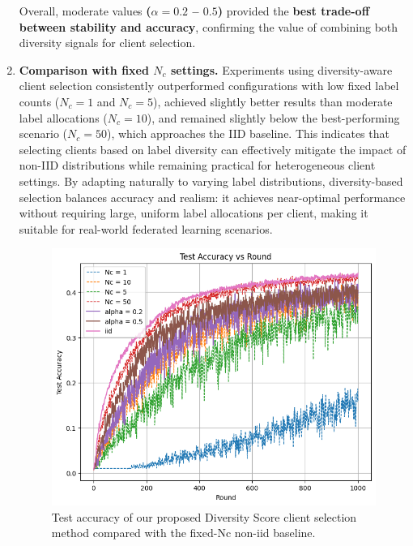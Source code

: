 \documentclass[10pt,twocolumn,letterpaper]{article}
\begin{document}
\begin{enumerate}
    Overall, moderate values \textbf{(\boldmath$\alpha=0.2$ -- $0.5$)} provided the \textbf{best trade-off between stability and accuracy}, confirming the value of combining both diversity signals for client selection.
    
    
    
    

    \item \textbf{Comparison with fixed $N_c$ settings.} 
    Experiments using diversity-aware client selection consistently outperformed configurations with low fixed label counts ($N_c=1$ and $N_c=5$), achieved slightly better results than moderate label allocations ($N_c=10$), and remained slightly below the best-performing scenario ($N_c=50$), which approaches the IID baseline. This indicates that selecting clients based on label diversity can effectively mitigate the impact of non-IID distributions while remaining practical for heterogeneous client settings. By adapting naturally to varying label distributions, diversity-based selection balances accuracy and realism: it achieves near-optimal performance without requiring large, uniform label allocations per client, making it suitable for real-world federated learning scenarios.

    \begin{figure}[H]
    \centering
    \includegraphics[width=0.6\linewidth]{figs/diversity_score_vs_fixed_Nc.png}
    \caption{Test accuracy of our proposed Diversity Score client selection method compared with the fixed-Nc non-iid baseline.}
    \label{fig:esempio}
    \end{figure}
\end{enumerate}
\end{document}
